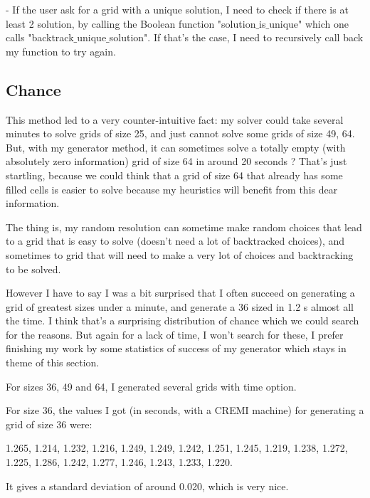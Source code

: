 \documentclass{article}
\begin{document}
\vspace{1\baselineskip}
 - If the user ask for a grid with a unique solution, I need to check if there is at least 2 solution, by calling the Boolean function "solution$\_$is$\_$unique" which one calls "backtrack$\_$unique$\_$solution". If that's the case, I need to recursively call back my function to try again. 


 \subsection{Chance}

 This method led to a very counter-intuitive fact: my solver could take several minutes to solve grids of size 25, and just cannot solve some grids of size 49, 64. But, with my generator method, it can sometimes solve a totally empty (with absolutely zero information) grid of size 64 in around 20 seconds ? That's just startling, because we could think that a grid of size 64 that already has some filled cells is easier to solve because my heuristics will benefit from this dear information.

 The thing is, my random resolution can sometime make random choices that lead to a grid that is easy to solve (doesn't need a lot of backtracked choices), and sometimes to grid that will need to make a very lot of choices and backtracking to be solved.

 However I have to say I was a bit surprised that I often succeed on generating a grid of greatest sizes under a minute, and generate a 36 sized in 1.2 s almost all the time. I think that's a surprising distribution of chance which we could search for the reasons. But again for a lack of time, I won't search for these, I prefer finishing my work by some statistics of success of my generator which stays in theme of this section.

\vspace{1\baselineskip}

For sizes 36, 49 and 64, I generated several grids with time option. 

\vspace{1\baselineskip}
For size 36, the values I got (in seconds, with a CREMI machine) for generating a grid of size 36 were:

1.265, 1.214, 1.232, 1.216, 1.249, 1.249, 1.242, 1.251, 1.245, 1.219, 1.238, 1.272, 1.225, 1.286, 1.242, 1.277, 1.246, 1.243, 1.233, 1.220.

It gives a standard deviation of around 0.020, which is very nice.
\end{document}
